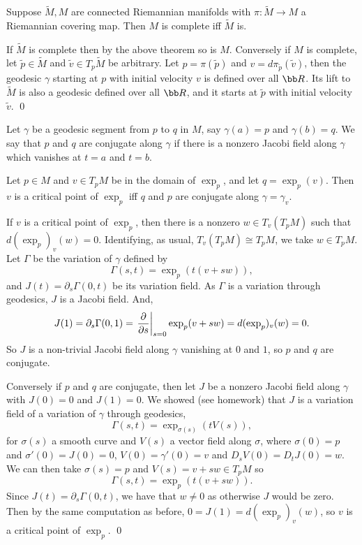 \eproof

\bcoro

    Suppose $\tilde M,M$ are connected Riemannian manifolds with $\pi\colon\tilde M\to M$ a Riemannian covering map.
    Then $M$ is complete iff $\tilde M$ is.

\ecoro

\bproof

    If $\tilde M$ is complete then by the above theorem so is $M$.
    Conversely if $M$ is complete, let $\tilde p\in\tilde M$ and $\tilde v\in T_p\tilde M$ be arbitrary.
    Let $p=\pi(\tilde p)$ and $v=d\pi_{\tilde p}(\tilde v)$, then the geodesic $\gamma$ starting at $p$ with initial velocity $v$ is defined over all $\bR$.
    Its lift to $\tilde M$ is also a geodesic defined over all $\bR$, and it starts at $\tilde p$ with initial velocity $\tilde v$.
    \qed

\eproof

\bdefn

    Let $\gamma$ be a geodesic segment from $p$ to $q$ in $M$, say $\gamma(a)=p$ and $\gamma(b)=q$.
    We say that $p$ and $q$ are {\emphcolor conjugate} along $\gamma$ if there is a nonzero Jacobi field along $\gamma$ which vanishes at $t=a$ and $t=b$.

\edefn

\bprop

    Let $p\in M$ and $v\in T_pM$ be in the domain of $\exp_p$, and let $q=\exp_p(v)$.
    Then $v$ is a critical point of $\exp_p$ iff $q$ and $p$ are conjugate along $\gamma=\gamma_v$.

\eprop

\bproof

    If $v$ is a critical point of $\exp_p$, then there is a nonzero $w\in T_v(T_pM)$ such that $d(\exp_p)_v(w)=0$.
    Identifying, as usual, $T_v(T_pM)\cong T_pM$, we take $w\in T_pM$.
    Let $\Gamma$ be the variation of $\gamma$ defined by
    $$ \Gamma(s,t) = \exp_p(t(v+sw)) , $$
    and $J(t)=\partial_s\Gamma(0,t)$ be its variation field.
    As $\Gamma$ is a variation through geodesics, $J$ is a Jacobi field.
    And,
    $$ J(1) = \partial_s\Gamma(0,1) = \left.{{\partial }\over{\partial s}}\right|_{s=0}\exp_p(v+sw) = d(\exp_p)_v(w) = 0 . $$
    So $J$ is a non-trivial Jacobi field along $\gamma$ vanishing at $0$ and $1$, so $p$ and $q$ are conjugate.

    Conversely if $p$ and $q$ are conjugate, then let $J$ be a nonzero Jacobi field along $\gamma$ with $J(0)=0$ and $J(1)=0$.
    We showed (see homework) that $J$ is a variation field of a variation of $\gamma$ through geodesics,
    $$ \Gamma(s,t) = \exp_{\sigma(s)}(tV(s)), $$
    for $\sigma(s)$ a smooth curve and $V(s)$ a vector field along $\sigma$, where $\sigma(0)=p$ and $\sigma'(0)=J(0)=0$,
    $V(0)=\gamma'(0)=v$ and $D_sV(0)=D_tJ(0)=w$.
    We can then take $\sigma(s)=p$ and $V(s)=v+sw\in T_pM$ so
    $$ \Gamma(s,t) = \exp_p(t(v+sw)) . $$
    Since $J(t)=\partial_s\Gamma(0,t)$, we have that $w\neq0$ as otherwise $J$ would be zero.
    Then by the same computation as before, $0=J(1)=d(\exp_p)_v(w)$, so $v$ is a critical point of $\exp_p$.
    \qed

